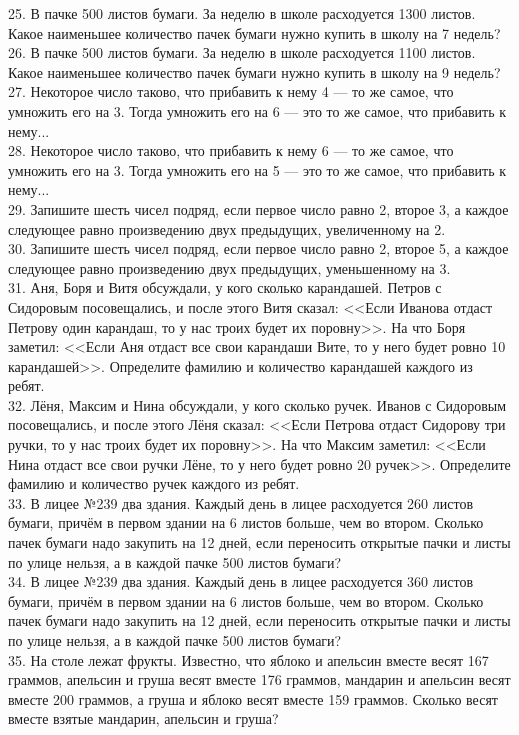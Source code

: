 \documentclass[12pt]{article}
\begin{document}
25. В пачке 500 листов бумаги. За неделю в школе расходуется 1300 листов. Какое наименьшее количество пачек бумаги нужно купить в школу на 7 недель?\\
26. В пачке 500 листов бумаги. За неделю в школе расходуется 1100 листов. Какое наименьшее количество пачек бумаги нужно купить в школу на 9 недель?\\
27. Некоторое число таково, что прибавить к нему 4 --- то же самое, что умножить его на 3. Тогда умножить его на 6 --- это то же самое, что прибавить к нему...\\
28. Некоторое число таково, что прибавить к нему 6 --- то же самое, что умножить его на 3. Тогда умножить его на 5 --- это то же самое, что прибавить к нему...\\
29. Запишите шесть чисел подряд, если первое число равно 2, второе 3, а каждое следующее равно произведению двух предыдущих, увеличенному на 2.\\
30. Запишите шесть чисел подряд, если первое число равно 2, второе 5, а каждое следующее равно произведению двух предыдущих, уменьшенному на 3.\\
31. Аня, Боря и Витя обсуждали, у кого сколько карандашей. Петров с Сидоровым посовещались, и после этого Витя сказал: <<Если Иванова отдаст Петрову один карандаш, то у нас троих будет их поровну>>. На что Боря заметил: <<Если Аня отдаст все свои карандаши Вите, то у него будет ровно 10 карандашей>>. Определите фамилию и количество карандашей каждого из ребят.\\
32. Лёня, Максим и Нина обсуждали, у кого сколько ручек. Иванов с Сидоровым посовещались, и после этого Лёня сказал: <<Если Петрова отдаст Сидорову три ручки, то у нас троих будет их поровну>>. На что Максим заметил: <<Если Нина отдаст все свои ручки Лёне, то у него будет ровно 20 ручек>>. Определите фамилию и количество ручек каждого из ребят.\\
33. В лицее №239 два здания. Каждый день в лицее расходуется 260 листов бумаги, причём в первом здании на 6 листов больше, чем во втором. Сколько пачек бумаги надо закупить на 12 дней, если переносить открытые пачки и листы по улице нельзя, а в каждой пачке 500 листов бумаги?\\
34. В лицее №239 два здания. Каждый день в лицее расходуется 360 листов бумаги, причём в первом здании на 6 листов больше, чем во втором. Сколько пачек бумаги надо закупить на 12 дней, если переносить открытые пачки и листы по улице нельзя, а в каждой пачке 500 листов бумаги?\\
35. На столе лежат фрукты. Известно, что яблоко и апельсин вместе весят 167 граммов, апельсин и груша весят вместе 176 граммов, мандарин и апельсин весят вместе 200 граммов, а груша и яблоко весят вместе 159 граммов. Сколько весят вместе взятые мандарин, апельсин и груша?\\
\end{document}
